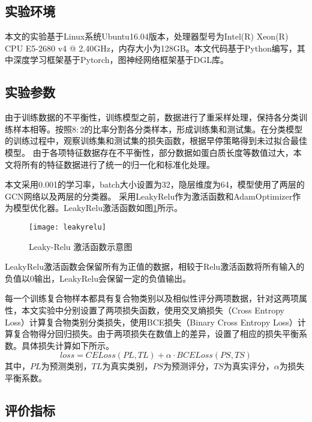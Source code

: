 \subsection{实验环境}
\label{subsection:allExperienceDesign:Environment}

本文的实验基于Linux系统Ubuntu16.04版本，处理器型号为Intel(R) Xeon(R) CPU E5-2680 v4 @ 2.40GHz，内存大小为128GB。本文代码基于Python编写，其中深度学习框架基于Pytorch，图神经网络框架基于DGL库\cite{wang_deep_2020}。

\subsection{实验参数}
\label{subsection:allExperienceDesign:nums}

由于训练数据的不平衡性，训练模型之前，数据进行了重采样处理，保持各分类训练样本相等。按照$8:2$的比率分割各分类样本，形成训练集和测试集。在分类模型的训练过程中，观察训练集和测试集的损失函数，根据早停策略得到未过拟合最佳模型。
由于各项特征数据存在不平衡性，部分数据如蛋白质长度等数值过大，本文将所有的特征数据进行了统一的归一化和标准化处理。

本文采用0.001的学习率，batch大小设置为32，隐层维度为64，模型使用了两层的GCN网络以及两层的分类器。
采用LeakyRelu作为激活函数和AdamOptimizer作为模型优化器。LeakyRelu激活函数如图\ref{fig:leakyrelu}所示。

\begin{figure}[htbp]
    \centering
    \texttt{[image: leakyrelu]}
    \caption{Leaky-Relu 激活函数示意图}
    \label{fig:leakyrelu}
\end{figure}
LeakyRelu激活函数会保留所有为正值的数据，相较于Relu激活函数将所有输入的负值以0输出，LeakyRelu会保留一定的负值输出。


每一个训练复合物样本都具有复合物类别以及相似性评分两项数据，针对这两项属性，本文实验中分别设置了两项损失函数，使用交叉熵损失（Cross Entropy Loss）计算复合物类别分类损失，使用BCE损失（Binary Cross Entropy Loss）计算复合物得分回归损失。由于两项损失在数值上的差异，设置了相应的损失平衡系数。具体损失计算如下所示。
\begin{equation}
    \label{equ:loss}
    loss=CELoss(PL,TL)+\alpha \cdot BCELoss(PS,TS)
\end{equation}
其中，$PL$为预测类别，$TL$为真实类别，$PS$为预测评分，$TS$为真实评分，$\alpha$为损失平衡系数。

\subsection{评价指标}
\label{subsection:allExperienceDesign:metrix}


